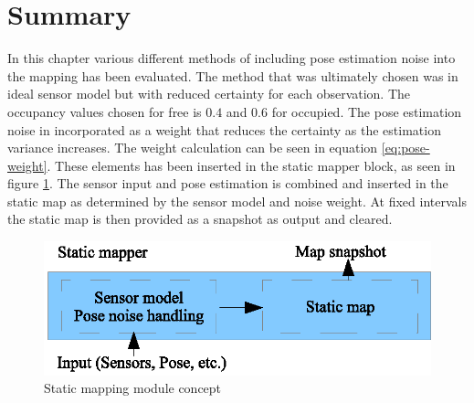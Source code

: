 \section{Summary}
In this chapter various different methods of including pose estimation noise into the mapping has been evaluated. The method that was ultimately chosen was in ideal sensor model but with reduced certainty for each observation. The occupancy values chosen for free is \(0.4\) and \(0.6\) for occupied. The pose estimation noise in incorporated as a weight that reduces the certainty as the estimation variance increases. The weight calculation can be seen in equation \ref{eq:pose-weight}. 
These elements has been inserted in the static mapper block, as seen in figure \ref{fig:static_map_detail}. 
The sensor input and pose estimation is combined and inserted in the static map as determined by the sensor model and noise weight. At fixed intervals the static map is then provided as a snapshot as output and cleared. 

\begin{figure}[htbp]
	\centering
	\includegraphics[scale=1]{chapters/static_mapping/figures/static_map_detail.eps}
	\caption{Static mapping module concept}
	\label{fig:static_map_detail}
\end{figure}


